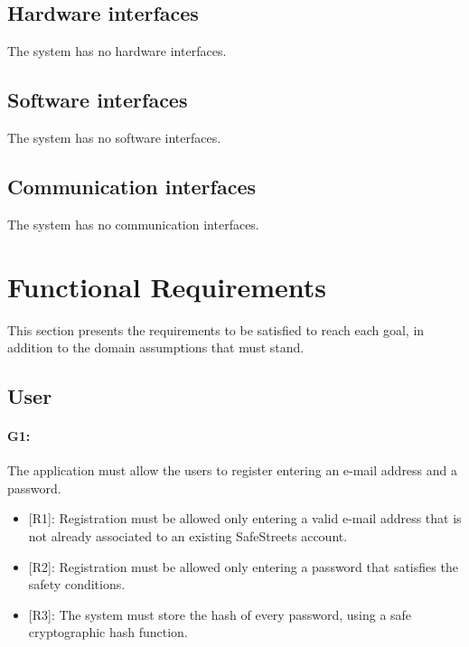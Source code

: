 \documentclass[12pt,a4paper]{report}
\begin{document}
		\subsection{Hardware interfaces}
			The system has no hardware interfaces.
		\subsection{Software interfaces}
			The system has no software interfaces.
		\subsection{Communication interfaces}
			The system has no communication interfaces.
	\section{Functional Requirements}
		This section presents the requirements to be satisfied to reach each goal, in addition to the domain assumptions that must stand.
		\subsection{User} 

			\paragraph {G1:} The application must allow the users to register entering an e-mail address and a password.
			\begin{itemize}
				\item{[R1]:} Registration must be allowed only entering a valid e-mail address that is not already associated to an existing SafeStreets account.
				\item{[R2]:} Registration must be allowed only entering a password that satisfies the safety conditions.
				\item{[R3]:} The system must store the hash of every password, using a safe cryptographic hash function.
			\end{itemize}
\end{document}
